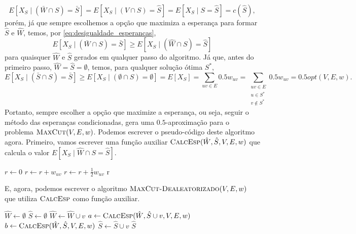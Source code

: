 \begin{homeworkProblem}[]
\begin{homeworkProblemAnswer}
$$ E[X_S \mid (\bar{W} \cap S) = \bar{S}] = E[X_S \mid (V \cap S) = \hat{S}] = E[X_S \mid S = \hat{S}] = c(\hat{S}),$$
porém, já que sempre escolhemos a opção que maximiza a esperança para formar $\hat{S}$ e $\hat{W}$, temos, por \eqref{eq:desigualdade_esperancas},
$$ E[X_S \mid (\bar{W} \cap S) = \bar{S}] \geq E[X_S \mid (\hat{W} \cap S) = \hat{S}] $$
para quaisquer $\hat{W}$ e $\hat{S}$ gerados em qualquer passo do algoritmo. Já que, antes do primeiro passo, $\hat{W} = \hat{S} = \emptyset$, temos, para qualquer solução ótima $S^*$, 
$$ 
    E[X_S \mid (\bar{S} \cap S) = 
    \bar{S}] \geq E[X_S \mid (\emptyset \cap S) = \emptyset] = 
    E[X_S] = 
    \sum \limits_{uv \in E} 0.5w_{uv} =
    \sum \limits_{\substack{uv \in E \\ u \in S^* \\ v \notin S^*}} 0.5w_{uv} = 
    0.5opt(V,E,w).
$$
Portanto, sempre escolher a opção que maximize a esperança, ou seja, seguir o método das esperanças condicionadas, gera uma $0.5$-aproximação para o problema $\textsc{MaxCut}(V,E,w)$. Podemos escrever o pseudo-código deste algoritmo agora. Primeiro, vamos escrever uma função auxiliar $\textsc{CalcEsp}(\hat{W},\hat{S}, V, E, w)$ que calcula o valor $E[X_S \mid \hat{W} \cap S = \hat{S}]$.

\pagebreak

\begin{algorithmic}[1]
\State $r \leftarrow 0$
                \State $r \leftarrow r + w_{uv}$
            \EndIf
            \State $r \leftarrow r + \frac{1}{2}w_{uv}$
        \EndIf
    \EndFor
\State \Return r
\EndFunction
\end{algorithmic}

E, agora, podemos escrever o algoritmo $\textsc{MaxCut-Dealeatorizado}(V, E, w)$ que utiliza $\textsc{CalcEsp}$ como função auxiliar.

\begin{algorithmic}[1]
\State $\hat{W} \leftarrow \emptyset$
\State $\hat{S} \leftarrow \emptyset$
        \State $\hat{W} \leftarrow \hat{W} \cup v$
        \State $a \leftarrow \textsc{CalcEsp}(\hat{W}, \hat{S} \cup v, V, E, w)$
        \State $b \leftarrow \textsc{CalcEsp}(\hat{W}, \hat{S}, V, E, w)$
            \State $\hat{S} \leftarrow \hat{S} \cup v$
        \EndIf
    \EndFor
\State \Return $\hat{S}$
\EndFunction
\end{algorithmic}

\end{homeworkProblemAnswer}

\end{homeworkProblem}


